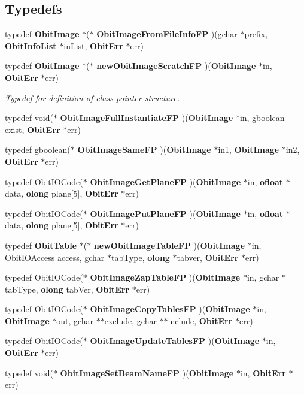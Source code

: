 \subsection*{Typedefs}
\begin{CompactItemize}
\item 
typedef {\bf Obit\-Image} $\ast$($\ast$ {\bf Obit\-Image\-From\-File\-Info\-FP} )(gchar $\ast$prefix, {\bf Obit\-Info\-List} $\ast$in\-List, {\bf Obit\-Err} $\ast$err)
\item 
typedef {\bf Obit\-Image} $\ast$($\ast$ {\bf new\-Obit\-Image\-Scratch\-FP} )({\bf Obit\-Image} $\ast$in, {\bf Obit\-Err} $\ast$err)
\begin{CompactList}\small\item\em Typedef for definition of class pointer structure. \item\end{CompactList}\item 
typedef void($\ast$ {\bf Obit\-Image\-Full\-Instantiate\-FP} )({\bf Obit\-Image} $\ast$in, gboolean exist, {\bf Obit\-Err} $\ast$err)
\item 
typedef gboolean($\ast$ {\bf Obit\-Image\-Same\-FP} )({\bf Obit\-Image} $\ast$in1, {\bf Obit\-Image} $\ast$in2, {\bf Obit\-Err} $\ast$err)
\item 
typedef Obit\-IOCode($\ast$ {\bf Obit\-Image\-Get\-Plane\-FP} )({\bf Obit\-Image} $\ast$in, {\bf ofloat} $\ast$data, {\bf olong} plane[5], {\bf Obit\-Err} $\ast$err)
\item 
typedef Obit\-IOCode($\ast$ {\bf Obit\-Image\-Put\-Plane\-FP} )({\bf Obit\-Image} $\ast$in, {\bf ofloat} $\ast$data, {\bf olong} plane[5], {\bf Obit\-Err} $\ast$err)
\item 
typedef {\bf Obit\-Table} $\ast$($\ast$ {\bf new\-Obit\-Image\-Table\-FP} )({\bf Obit\-Image} $\ast$in, Obit\-IOAccess access, gchar $\ast$tab\-Type, {\bf olong} $\ast$tabver, {\bf Obit\-Err} $\ast$err)
\item 
typedef Obit\-IOCode($\ast$ {\bf Obit\-Image\-Zap\-Table\-FP} )({\bf Obit\-Image} $\ast$in, gchar $\ast$tab\-Type, {\bf olong} tab\-Ver, {\bf Obit\-Err} $\ast$err)
\item 
typedef Obit\-IOCode($\ast$ {\bf Obit\-Image\-Copy\-Tables\-FP} )({\bf Obit\-Image} $\ast$in, {\bf Obit\-Image} $\ast$out, gchar $\ast$$\ast$exclude, gchar $\ast$$\ast$include, {\bf Obit\-Err} $\ast$err)
\item 
typedef Obit\-IOCode($\ast$ {\bf Obit\-Image\-Update\-Tables\-FP} )({\bf Obit\-Image} $\ast$in, {\bf Obit\-Err} $\ast$err)
\item 
typedef void($\ast$ {\bf Obit\-Image\-Set\-Beam\-Name\-FP} )({\bf Obit\-Image} $\ast$in, {\bf Obit\-Err} $\ast$err)
\end{CompactItemize}
